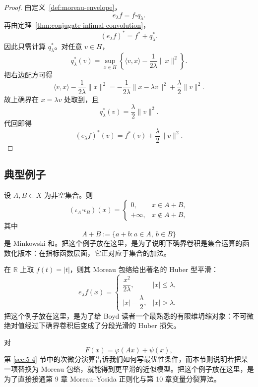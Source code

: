 \begin{proof}
由定义~\ref{def:moreau-envelope}，
\[
e_\lambda f=f\square q_\lambda.
\]
再由定理~\ref{thm:conjugate-infimal-convolution}，
\[
(e_\lambda f)^\ast=f^\ast+q_\lambda^\ast.
\]
因此只需计算 $q_\lambda^\ast$。对任意 $v\in H$，
\[
q_\lambda^\ast(v)
=
\sup_{x\in H}\left\{\langle v,x\rangle-\frac{1}{2\lambda}\|x\|^2\right\}.
\]
把右边配方可得
\[
\langle v,x\rangle-\frac{1}{2\lambda}\|x\|^2
=
-\frac{1}{2\lambda}\|x-\lambda v\|^2+\frac{\lambda}{2}\|v\|^2.
\]
故上确界在 $x=\lambda v$ 处取到，且
\[
q_\lambda^\ast(v)=\frac{\lambda}{2}\|v\|^2.
\]
代回即得
\[
(e_\lambda f)^\ast(v)=f^\ast(v)+\frac{\lambda}{2}\|v\|^2.
\]
\end{proof}

\subsection{典型例子}

\begin{example}
设 $A,B\subset X$ 为非空集合。则
\[
(\iota_A\square \iota_B)(x)=
\begin{cases}
0, & x\in A+B,\\
+\infty, & x\notin A+B,
\end{cases}
\]
其中
\[
A+B:=\{a+b:a\in A,\ b\in B\}
\]
是 Minkowski 和。把这个例子放在这里，是为了说明下确界卷积是集合运算的函数化版本：在指标函数层面，它正对应于集合的加法。
\end{example}

\begin{example}
在 $\mathbb R$ 上取 $f(t)=|t|$，则其 Moreau 包络给出著名的 Huber 型平滑：
\[
e_\lambda f(x)=
\begin{cases}
\dfrac{x^2}{2\lambda}, & |x|\le \lambda,\\[4pt]
|x|-\dfrac{\lambda}{2}, & |x|>\lambda.
\end{cases}
\]
把这个例子放在这里，是为了给 Boyd 读者一个最熟悉的有限维坍缩对象：不可微绝对值经过下确界卷积后变成了分段光滑的 Huber 损失。
\end{example}

\begin{example}[正则化分裂模型]
对
\[
F(x)=\varphi(Ax)+\psi(x),
\]
第 \ref{sec:5-4} 节中的次微分演算告诉我们如何写最优性条件，而本节则说明若把某一项替换为 Moreau 包络，就能得到更平滑的近似模型。把这个例子放在这里，是为了直接接通第 9 章 Moreau--Yosida 正则化与第 10 章变量分裂算法。
\end{example}

